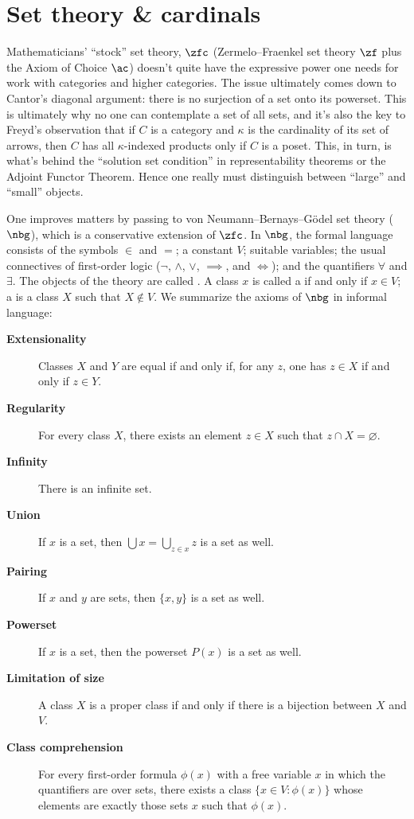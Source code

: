 
\chapter{Set theory \& cardinals}%
\label{cha:cardinals}

Mathematicians' \enquote{stock} set theory, $\zfc$
(Zermelo--Fraenkel set theory $\zf$ plus the Axiom of Choice $\ac$)
doesn't quite have the expressive power one needs for work with categories and higher categories.
The issue ultimately comes down to Cantor's diagonal argument:
there is no surjection of a set onto its powerset.
This is ultimately why no one can contemplate a set of all sets,
and it's also the key to Freyd's observation that
if $C$ is a category and $\kappa$ is the cardinality of its set of arrows,
then $C$ has all $\kappa$-indexed products only if $C$ is a poset.
This, in turn, is what's behind the \enquote{solution set condition}
in representability theorems or the Adjoint Functor Theorem.
Hence one really must distinguish between \enquote{large} and \enquote{small} objects.

One improves matters by passing to von Neumann--Bernays--Gödel set theory ($\nbg$),
which is a conservative extension of $\zfc$.
In $ \nbg $, the formal language consists of the symbols $\in$ and $=$;
a constant $V$; suitable variables;
the usual connectives of first-order logic ($\neg$, $\wedge$, $\vee$, $\implies$, and $\iff$);
and the quantifiers $\forall$ and $\exists$.
The objects of the theory are called .
A class $ x $ is called a  if and only if $x \in V$;
a  is a class $ X $ such that $ X \notin V $.
We summarize the axioms of $ \nbg $ in informal language:
\begin{description}
	\item[\textbf{Extensionality}] Classes $ X $ and $ Y $ are equal if and only if,
		for any $ z $, one has $ z \in X $ if and only if $ z \in Y $.
	\item[\textbf{Regularity}] For every class $ X $,
		there exists an element $ z \in X $ such that $ z \cap X = \varnothing $.
	\item[\textbf{Infinity}] There is an infinite set.
	\item[\textbf{Union}] If $ x $ is a set, then $ \bigcup x = \bigcup_{z \in x} z $ is a set as well.
	\item[\textbf{Pairing}] If $ x $ and $ y $ are sets, then $ \{x,y\} $ is a set as well.
	\item[\textbf{Powerset}] If $ x $ is a set, then the powerset $ P(x) $ is a set as well.
	\item[\textbf{Limitation of size}] A class $X$ is a proper class if and only if
		there is a bijection between $X$ and $V$.
	\item[\textbf{Class comprehension}] For every first-order formula $ \phi(x) $ with a free variable $ x $ in which the quantifiers are over sets,
		there exists a class $ \{ x \in V : \phi(x) \} $ whose elements are exactly those sets $ x $ such that $ \phi(x) $.
\end{description}

